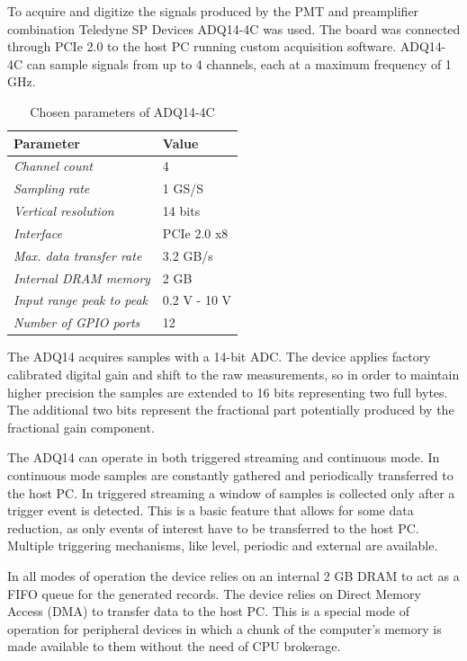 To acquire and digitize the signals produced by the PMT and preamplifier
combination Teledyne SP Devices ADQ14-4C was used. The board was connected
through PCIe 2.0 to the host PC running custom acquisition software.
ADQ14-4C can sample signals from up to 4 channels, each at a maximum
frequency of 1 GHz. 
\begin{table}[H]
\caption{Chosen parameters of ADQ14-4C}
\centering
  \begin{tabular}{l | l}
  {\bfseries Parameter} & {\bfseries Value}\\
  \hline
  \textit {Channel count}             & 4 \\ \hline
  \textit {Sampling rate}  & 1 GS/S \\ \hline
  \textit {Vertical resolution}   & 14 bits\\ \hline
  \textit {Interface}         & PCIe 2.0 x8\\ \hline
  \textit {Max. data transfer rate}         & 3.2 GB/s\\ \hline
  \textit {Internal DRAM memory}      & 2 GB\\ \hline
  \textit {Input range peak to peak}   & 0.2 V - 10 V\\ \hline
  \textit {Number of GPIO ports}         & 12\\ 
  \end{tabular}
  \label{tab:adq14_datasheet}
\end{table}


The ADQ14 acquires samples with a 14-bit ADC.
The device applies factory calibrated digital gain and shift
to the raw measurements, 
so in order to maintain higher precision the samples are 
extended to 16 bits representing two full bytes. 
The additional two bits represent the fractional part potentially
produced by the fractional gain component.


The ADQ14 can operate in both triggered streaming and continuous mode.
In continuous mode samples are constantly gathered and periodically
transferred to the host PC. In triggered streaming a window of samples is 
collected only after a trigger event is detected. This is a basic feature
that allows for some data reduction, as only events of interest have to
be transferred to the host PC. Multiple triggering mechanisms, 
like level, periodic and external are available.


In all modes of operation the device relies on an internal 2 GB DRAM
to act as a FIFO queue for the generated records.
The device relies on Direct Memory Access (DMA) to transfer
data to the host PC. This is a special mode of operation for 
peripheral devices in which a chunk of the computer's memory is
made available to them without the need of CPU brokerage.


